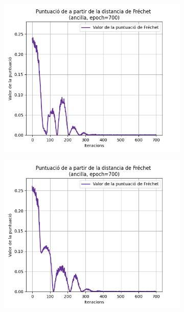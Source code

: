 \begin{figure}[H]
	\begin{subfigure}[b]{.32\linewidth}
		\includegraphics[width=\linewidth]{figures/data/FD_score_A4.png}
		\caption{}
	\end{subfigure}
	\begin{subfigure}[b]{.32\linewidth}
		\includegraphics[width=\linewidth]{figures/data/FD_score_A5.png}
		\caption{}
	\end{subfigure}
	\begin{subfigure}[b]{.32\linewidth}

\end{subfigure}
\end{figure}
